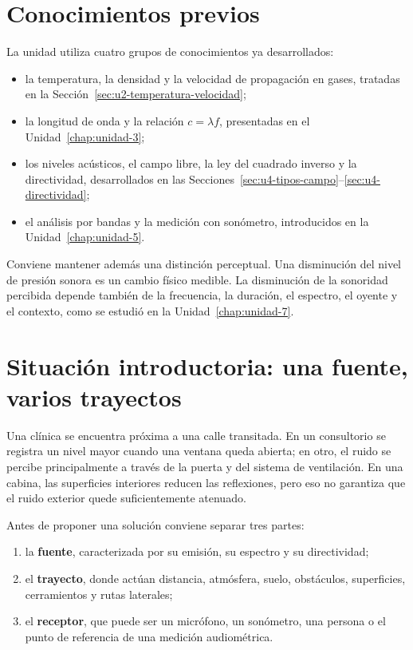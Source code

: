 \section{Conocimientos previos}
\label{sec:u9-previos}

La unidad utiliza cuatro grupos de conocimientos ya desarrollados:

\begin{itemize}
    \item la temperatura, la densidad y la velocidad de propagación en gases,
    tratadas en la Sección~\ref{sec:u2-temperatura-velocidad};
    \item la longitud de onda y la relación \(c=\lambda f\), presentadas en el
    Unidad~\ref{chap:unidad-3};
    \item los niveles acústicos, el campo libre, la ley del cuadrado inverso y
    la directividad, desarrollados en las
    Secciones~\ref{sec:u4-tipos-campo}--\ref{sec:u4-directividad};
    \item el análisis por bandas y la medición con sonómetro, introducidos en
    la Unidad~\ref{chap:unidad-5}.
\end{itemize}

Conviene mantener además una distinción perceptual. Una disminución del nivel
de presión sonora es un cambio físico medible. La disminución de la sonoridad
percibida depende también de la frecuencia, la duración, el espectro, el
oyente y el contexto, como se estudió en la Unidad~\ref{chap:unidad-7}.

\section{Situación introductoria: una fuente, varios trayectos}
\label{sec:u9-situacion}

Una clínica se encuentra próxima a una calle transitada. En un consultorio se
registra un nivel mayor cuando una ventana queda abierta; en otro, el ruido se
percibe principalmente a través de la puerta y del sistema de ventilación. En
una cabina, las superficies interiores reducen las reflexiones, pero eso no
garantiza que el ruido exterior quede suficientemente atenuado.

Antes de proponer una solución conviene separar tres partes:

\begin{enumerate}
    \item la \textbf{fuente}, caracterizada por su emisión, su espectro y su
    directividad;
    \item el \textbf{trayecto}, donde actúan distancia, atmósfera, suelo,
    obstáculos, superficies, cerramientos y rutas laterales;
    \item el \textbf{receptor}, que puede ser un micrófono, un sonómetro, una
    persona o el punto de referencia de una medición audiométrica.
\end{enumerate}

